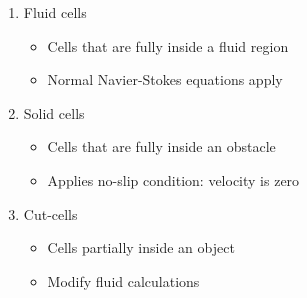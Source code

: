\documentclass[a4paper,12pt,titlepage]{article}
\begin{document}
\begin{minipage}[t]{0.65\textwidth}
	\begin{enumerate}
		\item{Fluid cells}
			\begin{itemize}
				\item{Cells that are fully inside a fluid region}
				\item{Normal Navier-Stokes equations apply}
			\end{itemize}
		\item{Solid cells}
			\begin{itemize}
				\item{Cells that are fully inside an obstacle}
				\item{Applies no-slip condition: velocity is zero}
			\end{itemize}
		\item{Cut-cells}
			\begin{itemize}
				\item{Cells partially inside an object}
				\item{Modify fluid calculations}
			\end{itemize}
	\end{enumerate}
\end{minipage}\hfill
\begin{minipage}[t]{0.3\textwidth}
	\vspace{10pt}
	\centering{}
	\label{fig:voxeldiagram}
\end{minipage}
\vspace{10pt}
\end{document}
